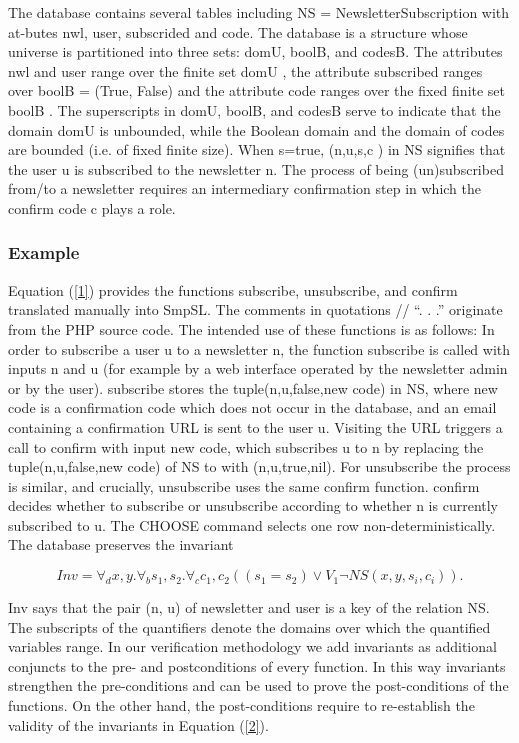 \documentclass[12pt]{acmart}
\begin{document}
The database contains several tables including NS = NewsletterSubscription with at-butes nwl, user, subscrided and code. The database is a structure whose universe is partitioned into three sets: domU, boolB, and codesB. The attributes nwl and user range over the finite set domU  , the attribute subscribed ranges over boolB =  (True, False) and the attribute code ranges over the fixed finite set boolB . The superscripts in domU, boolB, and codesB serve to indicate that the domain domU is unbounded, while the Boolean domain and the domain of codes are bounded (i.e. of fixed finite size). When s=true, (n,u,s,c ) in NS signifies that the user u is subscribed to the newsletter n. The process of being (un)subscribed from/to a newsletter requires an intermediary confirmation step in which the confirm code c plays a role. 

\subsubsection{Example}

Equation (\ref{1}) provides the functions subscribe, unsubscribe, and confirm translated manually into SmpSL. The comments in quotations // “. . .” originate from the PHP source code. The intended use of these functions is as follows: In order to subscribe a user u to a newsletter n, the function subscribe is called with inputs n and u (for example by a web interface operated by the newsletter admin or by the user). subscribe stores the tuple(n,u,false,new code) in NS, where new code is a confirmation code which does not occur in the database, and an email containing a confirmation URL is sent to the user u. Visiting the URL triggers a call to confirm with input new code, which subscribes u to n by replacing the tuple(n,u,false,new code) of NS to with (n,u,true,nil). For unsubscribe the process is similar, and crucially, unsubscribe uses the same confirm function. confirm decides whether to subscribe or unsubscribe according to whether n is currently subscribed to u. The CHOOSE command selects one row non-deterministically.\\
The database preserves the invariant

\begin{equation}
    Inv = \forall_d x,y.\forall_b s_1,s_2.\forall_c c_1,c_2 ((s_1=s_2 )\vee V_1 \neg NS(x,y,s_i,c_i )).
    \label{1}
\end{equation}

 Inv says that the pair (n, u) of newsletter and user is a key of the relation NS. The subscripts of the quantifiers denote the domains over which the quantified variables range. In our verification methodology we add invariants as additional conjuncts to the pre- and postconditions of every function. In this way invariants strengthen the pre-conditions and can be used to prove the post-conditions of the functions. On the other hand, the post-conditions require to re-establish the validity of the invariants in Equation (\ref{2}).
\end{document}
